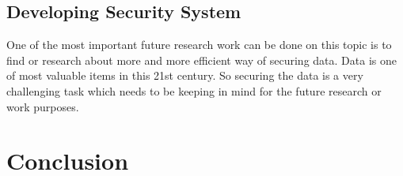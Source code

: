 \documentclass[conference,double column]{IEEEtran}
\begin{document}
	\subsection{Developing Security System}
	One of the most important future research work can be done on this topic is to find or research about more and more efficient way of securing data. Data is one of most valuable items in this 21st century. So securing the data is a very challenging task which needs to be keeping in mind for the future research or work purposes.
	
	
	\section{Conclusion} 
	
	
	 
	
	
\end{document}
